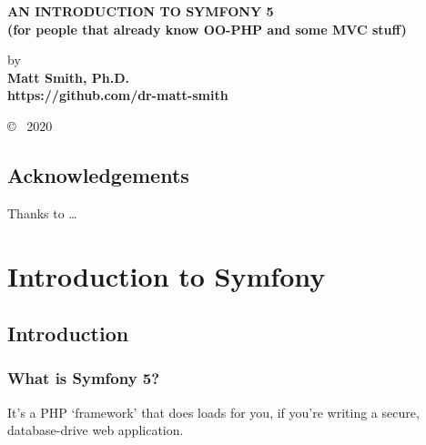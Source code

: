 \documentclass[a4paperpaper,openright]{book}
\date{}
\begin{document}
\begin{titlepage}
    \begin{center}
    
        \vspace*{1cm}
        

       \large{ \textbf{ \uppercase{An Introduction to Symfony 5}\\(for people that already know OO-PHP and some MVC stuff)}}
        
        \vspace{1.5cm}

        by\\
        \textbf{
        Matt Smith, Ph.D.\\https://github.com/dr-matt-smith
        }

       

        
        
        \vfill
  
            \copyright ~ 2020

     \end{center}
    \thispagestyle{empty}
\end{titlepage}

\newpage
\thispagestyle{empty}
\mbox{}

\frontmatter

\chapter{Acknowledgements}

Thanks to \ldots{} \tableofcontents

\mainmatter

\part{Introduction to Symfony}

\hypertarget{introduction}{%
\chapter{Introduction}\label{introduction}}

\hypertarget{what-is-symfony-5}{%
\section{What is Symfony 5?}\label{what-is-symfony-5}}

It's a PHP `framework' that does loads for you, if you're writing a
secure, database-drive web application.
\end{document}
